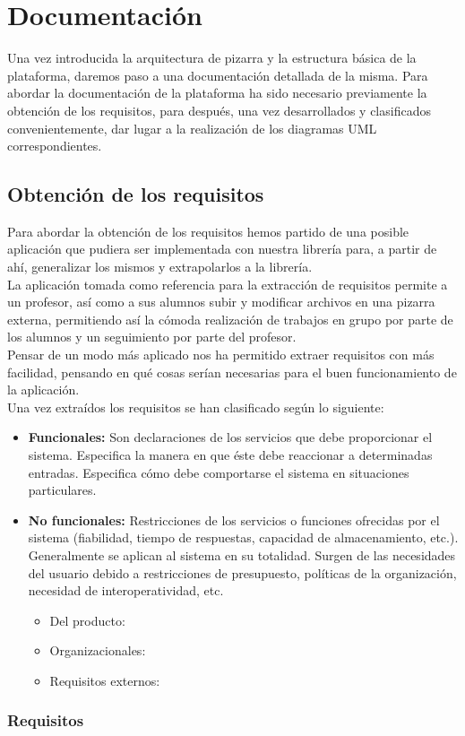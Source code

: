 \chapter{Documentación}
\lettrine[lines=1,slope=4pt,findent=0pt]{U}{}na vez introducida la arquitectura de pizarra y la estructura básica de la plataforma, daremos paso a una documentación detallada de la misma. Para abordar la documentación de la plataforma ha sido necesario previamente la obtención de los requisitos, para después, una vez desarrollados y clasificados convenientemente, dar lugar a la realización de los diagramas UML correspondientes.

\section{Obtención de los requisitos}
Para abordar la obtención de los requisitos hemos partido de una posible aplicación que pudiera ser implementada con nuestra librería para, a partir de ahí, generalizar los mismos y extrapolarlos a la librería.\\

La aplicación tomada como referencia para la extracción de requisitos permite a un profesor, así como a sus alumnos subir y modificar archivos en una pizarra externa, permitiendo así la cómoda realización de trabajos en grupo por parte de los alumnos y un seguimiento por parte del profesor.\\

Pensar de un modo más aplicado nos ha permitido extraer requisitos con más facilidad, pensando en qué cosas serían necesarias para el buen funcionamiento de la aplicación.\\

Una vez extraídos los requisitos se han clasificado según lo siguiente:

\begin{itemize}
	\item \textbf{Funcionales: }Son declaraciones de los servicios que debe proporcionar el sistema. Especifica la manera en que éste debe reaccionar a determinadas entradas. Especifica cómo debe comportarse el sistema en situaciones particulares.
	\item \textbf{No funcionales: } Restricciones de los servicios o funciones ofrecidas por el sistema (fiabilidad, tiempo de respuestas, capacidad de almacenamiento, etc.). Generalmente se aplican al sistema en su totalidad. Surgen de las necesidades del usuario debido a restricciones de presupuesto, políticas de la organización, necesidad de interoperatividad, etc.
	\begin{itemize}
		\item Del producto:
		\item Organizacionales:
		\item Requisitos externos:
	\end{itemize}
\end{itemize}

\subsection{Requisitos}